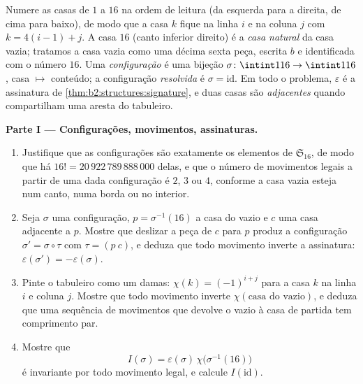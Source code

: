 \begin{problem}
\label{pb:b2:structures:1}
Numere as casas de $1$ a $16$ na ordem de leitura (da esquerda para a
direita, de cima para baixo), de modo que a casa $k$ fique na linha $i$ e na
coluna $j$ com $k
= 4(i - 1) + j$. A casa $16$ (canto inferior direito) é a \emph{casa
natural} da casa vazia; tratamos a casa vazia como uma décima sexta peça,
escrita $b$ e identificada com o número $16$. Uma
\emph{configuração} é uma bijeção $\sigma \colon \intint1{16}
\to \intint1{16}$, casa $\mapsto$ conteúdo; a configuração
\emph{resolvida} é $\sigma = \mathrm{id}$. Em todo o problema,
$\varepsilon$ é a assinatura de
\cref{thm:b2:structures:signature}, e duas casas são
\emph{adjacentes} quando compartilham uma aresta do tabuleiro.

\medskip
\noindent\textbf{Parte I --- Configurações, movimentos, assinaturas.}
\begin{enumerate}
  \item Justifique que as configurações são exatamente os elementos
        de $\mathfrak{S}_{16}$, de modo que há $16! =
        20\,922\,789\,888\,000$ delas, e que o número de
        movimentos legais a partir de uma dada configuração é $2$, $3$ ou $4$,
        conforme a casa vazia esteja num canto, numa borda ou no
        interior.
  \item Seja $\sigma$ uma configuração, $p = \sigma^{-1}(16)$ a
        casa do vazio e $c$ uma casa adjacente a $p$. Mostre
        que deslizar a peça de $c$ para $p$ produz a
        configuração $\sigma' = \sigma \circ \tau$ com $\tau =
        (p\ c)$, e deduza que todo movimento inverte a assinatura:
        $\varepsilon(\sigma') = -\varepsilon(\sigma)$.
  \item Pinte o tabuleiro como um damas: $\chi(k) = (-1)^{i+j}$ para a casa
        $k$ na linha $i$ e coluna $j$. Mostre que todo movimento inverte
        $\chi(\text{casa do vazio})$, e deduza que uma
        sequência de movimentos que devolve o vazio à casa de partida
        tem comprimento par.
  \item Mostre que
        \[
        I(\sigma) = \varepsilon(\sigma)\,
        \chi\bigl(\sigma^{-1}(16)\bigr)
        \]
        é invariante por todo movimento legal, e calcule
        $I(\mathrm{id})$.
\end{enumerate}


\end{problem}
